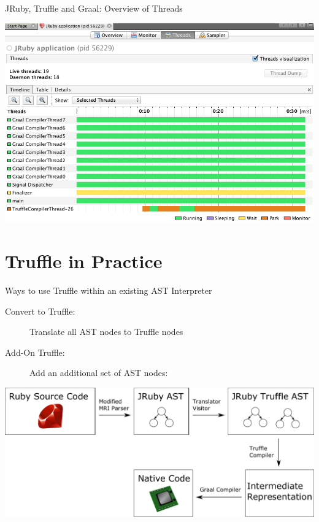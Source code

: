 \documentclass[xcolor=dvipsname,handout]{beamer} %
\begin{document}
\begin{frame}{JRuby, Truffle and Graal: Overview of Threads}
\begin{table}
    \centering
    \includegraphics[width=1.0\textwidth]{visualvm.png}
\end{table}
\end{frame}

\section{Truffle in Practice}

\begin{frame}{Ways to use Truffle within an existing AST Interpreter}

\begin{description}
 \item[Convert to Truffle:] Translate all AST nodes to Truffle nodes
 \item[Add-On Truffle:] Add an additional set of AST nodes:
\end{description}
\begin{table}
  \centering
  \includegraphics[width=1.0\textwidth]{graaltruffle.pdf}
\end{table}
\end{frame}
\end{document}
